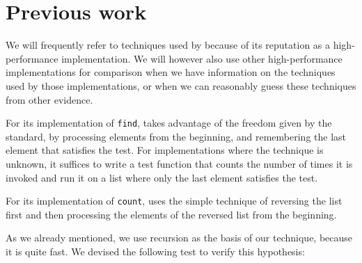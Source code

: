 \section{Previous work}

We will frequently refer to techniques used by \sbcl{} because of its
reputation as a high-performance implementation.  We will however also
use other high-performance implementations for comparison when we have
information on the techniques used by those implementations, or when
we can reasonably guess these techniques from other evidence.

For its implementation of \texttt{find}, \sbcl{} takes advantage of
the freedom given by the standard, by processing elements from the
beginning, and remembering the last element that satisfies the test.
For implementations where the technique is unknown, it suffices to
write a test function that counts the number of times it is invoked
and run it on a list where only the last element satisfies the test.

For its implementation of \texttt{count}, \sbcl{} uses the simple
technique of reversing the list first and then processing the elements
of the reversed list from the beginning.






As we already mentioned, we use recursion as the basis of our
technique, because it is quite fast.  We devised the following test to
verify this hypothesis:

